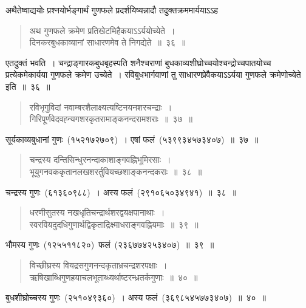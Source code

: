 \documentclass[11pt, openany]{book}
\begin{document}
\indent
अथैतेष्वाद्ययोः प्रश्नयोर्भङ्गार्थं गुणफले प्रदर्शयिष्यन्नादौ तदुक्तक्रममार्ययाऽऽह\textendash
\begin{quote}
{\ks अथ गुणफले क्रमेण प्रतिखेटमिहैकयाऽऽर्ययोच्येते~।\\
दिनकरबुधकाव्यानां साधारणमेव ते निगद्येते~॥~३६~॥}
\end{quote}
\indent
एतदुक्तं भवति~। चन्द्राङ्गारकबुधबृहस्पति शनैश्चराणां बुधकाव्यशीघ्रोच्चयोश्चन्द्रोच्चपातयोच्च प्रत्येकमेकार्यया गुणफले क्रमेण उच्येते~।
रविबुधभार्गवाणां तु साधारणप्रेवैकयाऽऽर्यया गुणफले क्रमेणोच्येते इति~॥~३६~॥
\begin{quote}
{\ks रविभृगुविदां नवाम्बरशैलाक्ष्यत्यष्टिनयनशरचन्द्राः~।\\
गिरिपूर्णवेदवह्न्यगशरकृतरामाङ्कनन्दरामशराः~॥~३७~॥}
\end{quote}
\indent
सूर्यकाव्यबुधानां गुणः~(१५२१७२७०९)~। एषां फलं~(५३९९३४५७३४०७)~॥~३७~॥
\begin{quote}
{\ks चन्द्रस्य दन्तिसिन्धुरनन्दाकाशाङ्गवह्निभूमिरसाः~।\\
भूयुगनवककृतानलखशरर्तुवियच्छशाङ्कनन्दकराः~॥~३८~॥}
\end{quote}
\indent
चन्द्रस्य गुणः~(६१३६०९८८)~। अस्य फलं~(२९१०६५०३४९४१)~॥~३८~॥
\begin{quote}
{\ks धरणीसुतस्य नखधृतिचन्द्रार्थशरद्वयक्षपानाथाः~।\\
स्वरवियदुदधिगुणार्थद्विकृताद्रिक्ष्माधराङ्गवह्लियमाः~॥~३९~॥}
\end{quote}
\indent
भौमस्य गुणः~(१२५५११८२०)~फलं~(२३६७७४२५३४०७)~॥~३९~॥
\begin{quote}
{\ks विच्छीघ्रस्य वियद्रसगुणनन्दकृताभ्रचन्द्रशरपक्षाः~।\\
ऋषिखाब्धिगुणहयाचलभूताब्ध्यर्थाष्टरन्ध्रतर्कगुणाः~॥~४०~॥}
\end{quote}
\indent
बुधशीघ्रोच्चस्य गुणः~(२५१०४९३६०)~। अस्य फलं~(३६९८५४५७७३४०७)~॥~४०~॥
\end{document}
